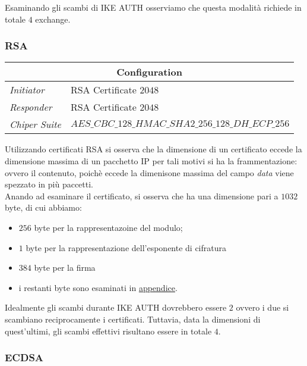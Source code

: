 \documentclass[
10pt, %
a4paper, %
oneside, %
headinclude,footinclude, %
BCOR5mm, %
]{scrartcl}
\begin{document}
\noindent
Esaminando gli scambi di IKE AUTH osserviamo che questa modalità richiede in totale $4$ exchange. 

\subsubsection{RSA}

\begin{center}
    \setlength{\arrayrulewidth}{0.4mm}
    \renewcommand{\arraystretch}{1.3}
    \begin{tabular}{|l|l|}
        \hline
        \multicolumn{2}{|c|}{\textbf{Configuration}} \\
        \hline
        \textit{Initiator} & RSA Certificate $2048$ \\
        \textit{Responder} & RSA Certificate $2048$ \\
        \textit{Chiper Suite} & $AES\_CBC\_128\_HMAC\_SHA2\_256\_128\_DH\_ECP\_256$ \\
        \hline
    \end{tabular}
\end{center}
\vspace*{0.2cm}
\noindent
Utilizzando certificati RSA si osserva che la dimensione di un certificato eccede la dimensione massima di un pacchetto IP
per tali motivi si ha la frammentazione: ovvero il contenuto, poichè eccede la dimenisone massima del campo \textit{data} viene
spezzato in più paccetti.
\newline  \\
\noindent
Anando ad esaminare il certificato, si osserva che ha una dimensione pari a $1032$ byte, di cui abbiamo:
\begin{itemize}
    \item $256$ byte per la rappresentazoine del modulo;
    \item $1$ byte per la rappresentazione dell'esponente di cifratura
    \item $384$ byte per la firma 
    \item i restanti byte sono esaminati in  \hyperlink{certificati}{appendice}.
\end{itemize} 

\noindent
Idealmente gli scambi durante IKE AUTH dovrebbero essere $2$ ovvero i due si scambiano reciprocamente i certificati. Tuttavia,
data la dimensioni di quest'ultimi, gli scambi effettivi risultano essere in totale $4$. 


\subsubsection{ECDSA}
\end{document}
